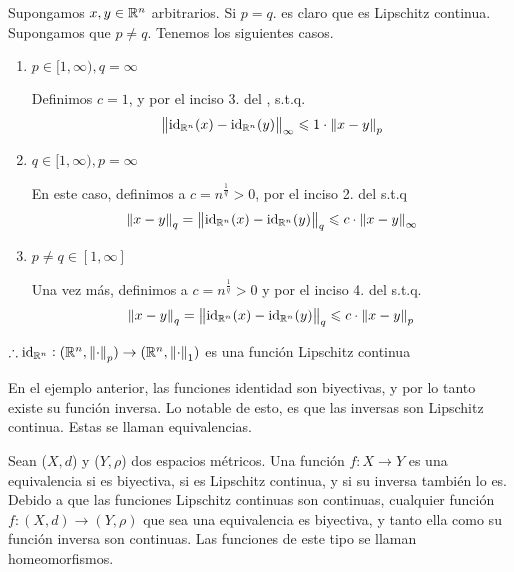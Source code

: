 \begin{proofexplanation}
    Supongamos $x,y \in \mathbb{R}^n$ arbitrarios. Si $p=q$. es claro que es Lipschitz continua. Supongamos que $p \neq q$. Tenemos los siguientes casos.

    \begin{enumerate}
        \item $p \in [1,\infty), q = \infty$

        Definimos $c = 1$, y por el inciso 3. del , s.t.q.
        \begin{equation*}
            {\norm{{\mathrm{id}}_{\ensuremath{\mathbb{R}}^n}(x)-{\mathrm{id}}_{\ensuremath{\mathbb{R}}^n}(y)}}_{\infty} \leqslant 1 \cdot {\norm{x-y}}_{p}
        \end{equation*}
        \item $q \in [1,\infty), p = \infty$

        En este caso, definimos a $c = {n}^{\frac{1}{q}} > 0$, por el inciso 2. del  s.t.q
        \begin{equation*}
             {\norm{x-y}}_{q} =  {\norm{{\mathrm{id}}_{\mathbb{R}^n}(x)-{\mathrm{id}}_{\mathbb{R}^n}(y)}}_{q} \leqslant c \cdot {\norm{x-y}}_{\infty}
        \end{equation*}

        \item $p \neq q \in [1,\infty]$

        Una vez más, definimos a $c = {n}^{\frac{1}{q}} > 0$ y por el inciso 4. del  s.t.q.
        \begin{equation*}
            {\norm{x-y}}_{q} = {\norm{{\mathrm{id}}_{\mathbb{R}^n}(x)-{\mathrm{id}}_{\mathbb{R}^n}(y)}}_{q} \leqslant c \cdot {\norm{x-y}}_{p}
        \end{equation*}
    \end{enumerate}
    $\therefore  {\mathrm{id}}_{\mathbb{R}^n} : (\mathbb{R}^n, {\norm{\cdot}}_{p}) \to (\mathbb{R}^n, {\norm{\cdot}}_{1})$ es una función Lipschitz continua
\end{proofexplanation}

\begin{remark}
    En el ejemplo anterior, las funciones identidad son biyectivas, y por lo tanto existe su función inversa. Lo notable de esto, es que las inversas son Lipschitz continua. Estas se llaman equivalencias.
\end{remark}

\begin{definition}[Equivalencia] \label{defequiv}
   Sean ($X,d$) y ($Y,\rho$) dos espacios métricos. Una función $f : X \to Y$ es una equivalencia si es biyectiva, si es Lipschitz continua, y si su inversa también lo es. Debido a que las funciones Lipschitz continuas son continuas, cualquier función $f: (X,d) \to (Y,\rho)$ que sea una equivalencia es biyectiva, y tanto ella como su función inversa son continuas. Las funciones de este tipo se llaman homeomorfismos.
\end{definition}

